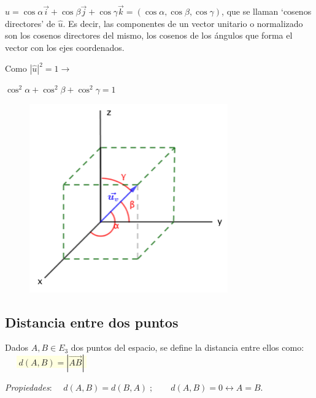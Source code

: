 \vspace{-3mm}\begin{multicols}{2}
$\widehat u=\cos \alpha \vec i + \cos \beta \vec j + \cos \gamma \vec k=(\cos \alpha, \cos \beta, \cos \gamma)$, que se llaman `cosenos directores' de $\widehat u$. Es decir, las componentes de un vector unitario o normalizado son los cosenos directores del mismo, los cosenos de los ángulos que forma el vector con los ejes coordenados.

\textcolor{gris}{Como $|\widehat u|^2=1 \to $}

\textcolor{gris}{$\cos^2 \alpha + \cos^2 \beta + \cos^2 \gamma=1$}

\begin{figure}[H]
	\centering
	\includegraphics[width=.45\textwidth]{imagenes/imagenes09/T09IM18.png}
\end{figure}
\end{multicols}

\subsection{Distancia entre dos puntos}

\begin{defi}
Dados $A,B \in E_3$ dos puntos del espacio, se define la distancia entre ellos como: $\quad$ \colorbox{LightYellow}{$\; d(A,B)=|\overrightarrow{AB}|\;$}

\noindent \textit{Propiedades}:
$\quad d(A,B)=d(B,A)\; ;  \qquad  d(A,B)=0 \leftrightarrow A=B$.	
\end{defi}

